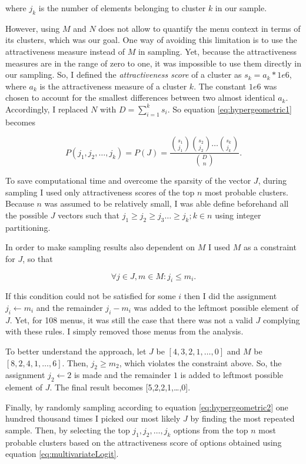 \documentclass[a4paper,12pt]{article}
\begin{document}
where $j_k$ is the number of elements belonging to cluster $k$ in our sample. 
 
However, using $M$ and $N$ does not allow to quantify the menu context in terms of its clusters, which was our goal. One way of avoiding this limitation is to use the attractiveness measure instead of $M$ in sampling. Yet, because the attractiveness measures are in the range of zero to one, it was impossible to use them directly in our sampling. So, I defined the \textit{attractiveness score} of a cluster as $s_k = a_k \ast 1e6$, where $a_k$ is the attractiveness measure of a cluster $k$. The constant $1e6$ was chosen to account for the smallest differences between two almost identical $a_k$. Accordingly, I replaced $N$ with $D=\sum_{i=1}^{k}s_i$. So equation \ref{eq:hypergeometric1} becomes

\begin{equation}\label{eq:hypergeometric2}
    P(j_1, j_2,\ldots, j_k) = P(J) =\frac{{s_1\choose j_1} {s_2\choose j_2} \dots {s_k\choose j_k}}{{D\choose n}}.
\end{equation}

To save computational time and overcome the sparsity of the vector $J$, during sampling I used only attractiveness scores of the top $n$ most probable clusters. Because $n$ was assumed to be relatively small, I was able define beforehand all the possible $J$ vectors such that $j_1\geq j_2\geq j_3\ldots\geq j_k; k \in n$ using integer partitioning.

In order to make sampling results also dependent on $M$ I used $M$ as a constraint for $J$, so that 

$$ \forall j \in J,m \in M: j_i\le m_i.$$

If this condition could not be satisfied for some $i$ then I did the assignment ${j_i\gets m_i}$ and the remainder $j_i-m_i$ was added to the leftmost possible element of $J$.  Yet, for 108 menus, it was still the case that there was not a valid $J$ complying with these rules. I simply removed those menus from the analysis. 

To better understand the approach, let $J$ be $[4, 3, 2, 1,\ldots,0]$ and $M$ be $[8, 2, 4, 1,\dots, 6]$. Then, $j_2\geq m_2$, which violates the constraint above. So, the assignment $j_2\gets2$ is made and the remainder $1$ is added to leftmost possible element of $J$. The final result becomes [5,2,2,1,\ldots,0].

Finally, by randomly sampling according to equation \ref{eq:hypergeometric2} one hundred thousand times I picked our most likely $J$ by finding the most repeated sample. Then, by selecting the top $j_1, j_2, \dots, j_k$ options from the top $n$ most probable clusters based on the attractiveness score of options obtained using equation \ref{eq:multivariateLogit}.
\end{document}
